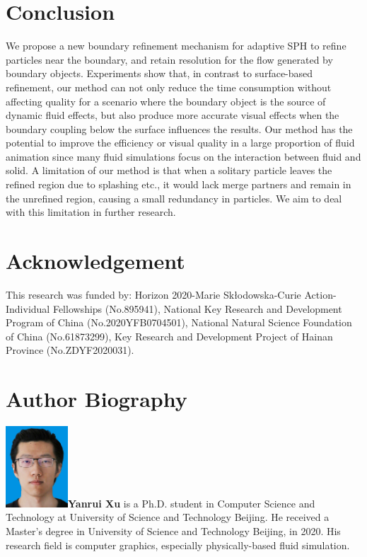\documentclass[VANCOUVER,STIX1COL]{WileyNJD-v2}
\begin{document}
\section{Conclusion}

We propose a new boundary refinement mechanism for adaptive SPH to refine particles near the boundary, and retain resolution for the flow generated by boundary objects. Experiments show that, in contrast to surface-based refinement, our method can not only reduce the time consumption without affecting quality for a scenario where the boundary object is the source of dynamic fluid effects, but also produce more accurate visual effects when the boundary coupling below the surface influences the results. Our method has the potential to improve the efficiency or visual quality in a large proportion of fluid animation since many fluid simulations focus on the interaction between fluid and solid. A limitation of our method is that when a solitary particle leaves the refined region due to splashing etc., it would lack merge partners and remain in the unrefined region, causing a small redundancy in particles. We aim to deal with this limitation in further research. 


\section*{Acknowledgement}
This research was funded by: Horizon 2020-Marie Skłodowska-Curie Action-Individual Fellowships (No.895941), National Key Research and Development Program of China (No.2020YFB0704501), National Natural Science Foundation of China (No.61873299), Key Research and Development Project of Hainan Province (No.ZDYF2020031).

\nocite{*}%


\section*{Author Biography}

\begin{biography}{\includegraphics[width=66pt,height=86pt]{VANCOUVER/figure/photos/YanruiXu.jpg}}{\textbf{Yanrui Xu} is a Ph.D. student in Computer Science and Technology at University of Science and Technology Beijing. He received a Master's degree in University of Science and Technology Beijing, in 2020. His research field is computer graphics, especially physically-based fluid simulation.}
\end{biography}
\end{document}
